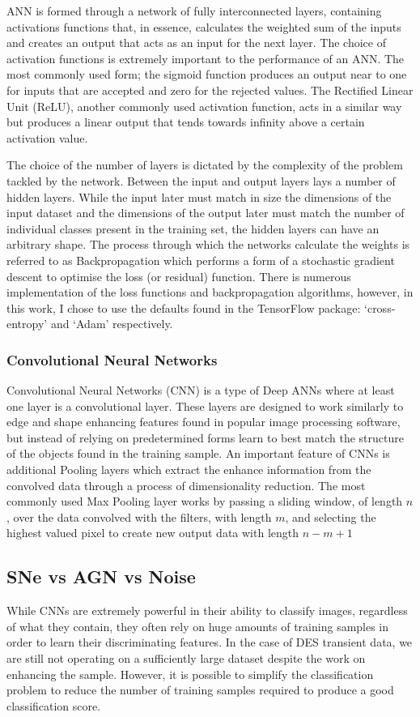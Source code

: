 ANN is formed through a network of fully interconnected layers, containing activations functions that, in essence, calculates the weighted sum of the inputs and creates an output that acts as an input for the next layer. The choice of activation functions is extremely important to the performance of an ANN. The most commonly used form; the sigmoid function produces an output near to one for inputs that are accepted and zero for the rejected values. The Rectified Linear Unit (ReLU), another commonly used activation function, acts in a similar way but produces a linear output that tends towards infinity above a certain activation value.

The choice of the number of layers is dictated by the complexity of the problem tackled by the network. Between the input and output layers lays a number of hidden layers. While the input later must match in size the dimensions of the input dataset and the dimensions of the output later must match the number of individual classes present in the training set, the hidden layers can have an arbitrary shape. The process through which the networks calculate the weights is referred to as Backpropagation which performs a form of a stochastic gradient descent to optimise the loss (or residual) function. There is numerous implementation of the loss functions and backpropagation algorithms, however, in this work, I chose to use the defaults found in the TensorFlow package: `cross-entropy' and `Adam' respectively.

\subsubsection{Convolutional Neural Networks}
Convolutional Neural Networks (CNN) is a type of Deep ANNs where at least one layer is a convolutional layer. These layers are designed to work similarly to edge and shape enhancing features found in popular image processing software, but instead of relying on predetermined forms learn to best match the structure of the objects found in the training sample. An important feature of CNNs is additional Pooling layers which extract the enhance information from the convolved data through a process of dimensionality reduction. The most commonly used Max Pooling layer works by passing a sliding window, of length $n$, over the data convolved with the filters, with length $m$, and selecting the highest valued pixel to create new output data with length $n-m+1$

\subsection{SNe vs AGN vs Noise}
While CNNs are extremely powerful in their ability to classify images, regardless of what they contain, they often rely on huge amounts of training samples in order to learn their discriminating features. In the case of DES transient data, we are still not operating on a sufficiently large dataset despite the work on enhancing the sample. However, it is possible to simplify the classification problem to reduce the number of training samples required to produce a good classification score.

